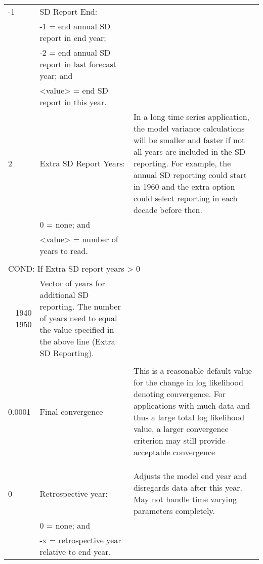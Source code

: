 {\begin{landscape}
\begin{longtable}{p{1.5cm} p{7.2cm} p{12.3cm}}
 \hline
 -1 & SD Report End: & \Tstrut\\
    & -1 = end annual SD report in end year; & \\
    & -2 = end annual SD report in last forecast year; and & \\
    & <value> = end SD report in this year. & \\
	   
 \hline
 2 & Extra SD Report Years: & \multirow{1}{1cm}[-0.25cm]{\parbox{12.5cm}{In a long time series application, the model variance calculations will be smaller and faster if not all years are included in the SD reporting.  For example, the annual SD reporting could start in 1960 and the extra option could select reporting in each decade before then.}}\Tstrut\\
   & 0 = none; and & \\
   & <value> = number of years to read. &  \\
   & & \\

 \hline  
 \multicolumn{3}{l}{COND: If Extra SD report years > 0} \Tstrut\\

 \hline
 \multicolumn{1}{r}{1940 1950} & \multirow{1}{1cm}[-0.25cm]{\parbox{19.5cm}{Vector of years for additional SD reporting. The number of years need to equal the value specified in the above line (Extra SD Reporting). }} \Tstrut\\
 & & \\

 \pagebreak 
 0.0001 & Final convergence & \multirow{1}{1cm}[-0.25cm]{\parbox{12.5cm}{This is a reasonable default value for the change in log likelihood denoting convergence.  For applications with much data and thus a large total log likelihood value, a larger convergence criterion may still provide acceptable convergence}}\Tstrut\\
        & & \\
        & & \\
		& & \\ 
 
 \hline
 0 & Retrospective year: & \multirow{1}{1cm}[-0.25cm]{\parbox{12.5cm}{Adjusts the model end year and disregards data after this year.  May not handle time varying parameters completely.}} \Tstrut\\
   & 0 = none; and & \\
   & -x = retrospective year relative to end year. & \\
  

\end{longtable}
\end{landscape}}
